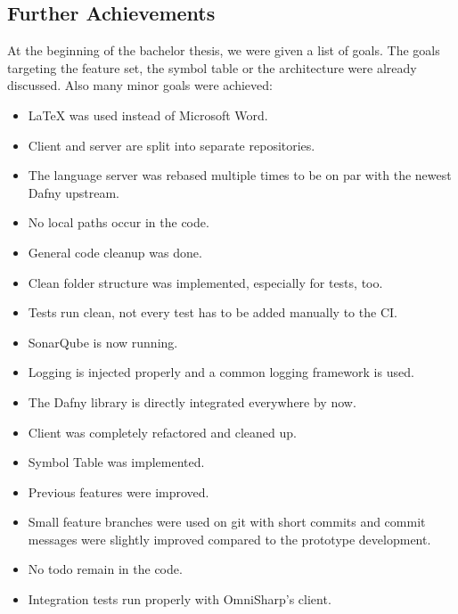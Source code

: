 \subsection{Further Achievements}
At the beginning of the bachelor thesis, we were given a list of goals.
The goals targeting the feature set, the symbol table or the architecture were already discussed.
Also many minor goals were achieved:
\begin{itemize}
    \item LaTeX was used instead of Microsoft Word.
    \item Client and server are split into separate repositories.
    \item The language server was rebased multiple times to be on par with the newest Dafny upstream.
    \item No local paths occur in the code.
    \item General code cleanup was done.
    \item Clean folder structure was implemented, especially for tests, too.
    \item Tests run clean, not every test has to be added manually to the CI.
    \item SonarQube is now running.
    \item Logging is injected properly and a common logging framework is used.
    \item The Dafny library is directly integrated everywhere by now.
    \item Client was completely refactored and cleaned up.
    \item Symbol Table was implemented.
    \item Previous features were improved.
    \item Small feature branches were used on git with short commits and commit messages were slightly improved compared to the prototype development.
    \item No todo remain in the code.
    \item Integration tests run properly with OmniSharp's client.
\end{itemize}
